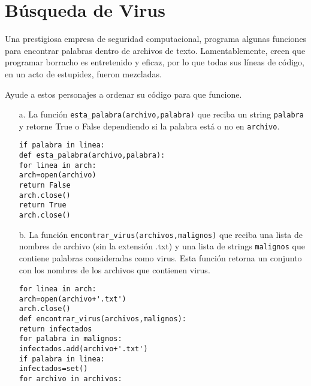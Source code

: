 \section{Búsqueda de Virus}

Una prestigiosa empresa de seguridad computacional, programa algunas funciones para encontrar palabras dentro de archivos de texto. Lamentablemente, creen que programar borracho es entretenido y eficaz, por lo que todas sus líneas de código, en un acto de estupidez, fueron mezcladas.

Ayude a estos personajes a ordenar su código para que funcione.

\begin{itemize}
    \item[a.] La función \texttt{esta\_palabra(archivo,palabra)} que reciba un string \texttt{palabra} y retorne True o False dependiendo si la palabra está o no en \texttt{archivo}.
    
    \begin{lstlisting}[style=consola]
if palabra in linea:
def esta_palabra(archivo,palabra):
for linea in arch:
arch=open(archivo)
return False
arch.close()
return True
arch.close()
    \end{lstlisting}
    
    \item[b.] La función \texttt{encontrar\_virus(archivos,malignos)} que reciba una lista de nombres de archivo (sin la extensión .txt) y una lista de strings \texttt{malignos} que contiene palabras consideradas como virus. Esta función retorna un conjunto con los nombres de los archivos que contienen virus.
\begin{lstlisting}[style=consola]
for linea in arch:
arch=open(archivo+'.txt')
arch.close()
def encontrar_virus(archivos,malignos):
return infectados
for palabra in malignos:
infectados.add(archivo+'.txt')
if palabra in linea:
infectados=set()
for archivo in archivos:
\end{lstlisting}
\end{itemize}

